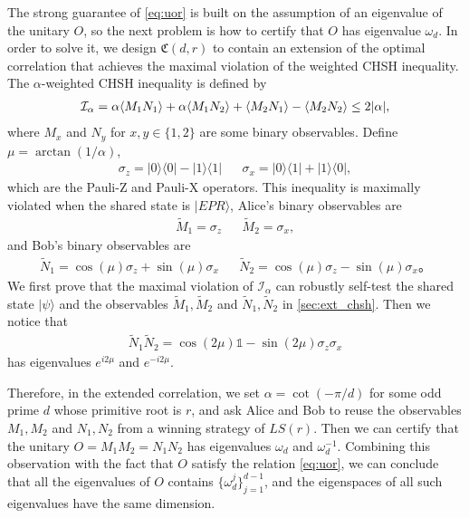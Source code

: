 \documentclass[11pt,letterpaper]{article}
\newcommand{\ket}[1]{|#1\rangle}
\newcommand{\ketbra}[2]{|#1\rangle\langle#2|}
\newcommand{\x}{\otimes}
\DeclarePairedDelimiter{\ip}{\langle}{\rangle}
\newcommand{\1}{\mathbb{1}}
\newcommand{\LS}{LS}
\newcommand{\paulix}{\sigma_x}
\newcommand{\pauliz}{\sigma_z}
\newcommand{\tM}{\tilde{M}}
\newcommand{\tN}{\tilde{N}}
\newcommand{\fC}{\mathfrak{C}}
\newcommand{\I}{\mathcal{I}}
\theoremstyle{definition}
\begin{document}
The strong guarantee of \cref{eq:uor} is built on the assumption of an eigenvalue
of the unitary $O$, so the next problem is how to certify that $O$ has eigenvalue $\omega_d$.
In order to solve it, we design $\fC(d,r)$ to contain 
an extension of the optimal correlation 
that achieves the maximal violation of the weighted
CHSH inequality.
The $\alpha$-weighted CHSH inequality is defined by
\begin{align*}
    \I_\alpha = \alpha\ip{M_1N_1}+\alpha\ip{M_1N_2} + \ip{M_2N_1} - \ip{M_2N_2}\leq 2|\alpha|,
\end{align*}
where $M_x$ and $N_y$ for $x,y \in \{1, 2\}$ are some binary observables.
Define $\mu = \arctan(1/\alpha)$,
\begin{align*}
    \pauliz = \ketbra{0}{0} - \ketbra{1}{1} && \paulix = \ketbra{0}{1} + \ketbra{1}{0},
\end{align*}
which are the Pauli-Z and Pauli-X operators.
This inequality is maximally violated when the shared state is $\ket{EPR}$,
Alice's binary observables are
\begin{align*}
    \tM_1 = \pauliz && \tM_2 = \paulix,
\end{align*}
and Bob's binary observables are
\begin{align*}
    \tN_1 = \cos(\mu) \pauliz+ \sin(\mu) \paulix  && \tN_2 = \cos(\mu) \pauliz - \sin(\mu) \paulix。
\end{align*}
We first prove that the maximal violation of $\I_\alpha$ can robustly self-test the shared
state $\ket{\psi}$ and the observables $\tM_1, \tM_2$ and $\tN_1, \tN_2$ in \cref{sec:ext_chsh}.
Then we notice that 
\begin{align*}
    \tN_1\tN_2 = \cos(2\mu) \1  - \sin(2 \mu) \pauliz \paulix 
\end{align*}
has eigenvalues $e^{i 2\mu}$ and $e^{-i 2\mu}$.

Therefore, in the extended correlation, we set $\alpha = \cot( -\pi/d )$
for some odd prime $d$ whose primitive root is $r$,
and ask Alice and Bob
to reuse the observables $M_1, M_2$ and $N_1, N_2$ from a winning strategy of $\LS(r)$. Then we can certify that
the unitary $O = M_1M_2 = N_1N_2$ has eigenvalues $\omega_d$ and $\omega_d^{-1}$.
Combining this observation with the fact that $O$ satisfy the relation \cref{eq:uor},
we can conclude that all the eigenvalues of $O$ contains $\{ \omega_d^j \}_{j=1}^{d-1}$,
and the eigenspaces of all such eigenvalues have the same dimension.

\end{document}
